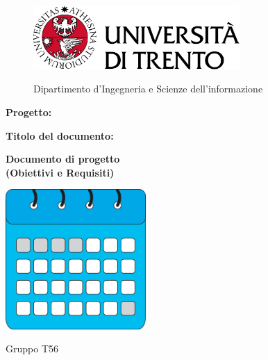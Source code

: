 \begin{titlepage}
    \begin{figure}[!htb]
        \includegraphics[width=0.7\textwidth]{img/logo_unitn.png}
        \endminipage
        \hfill
        \begin{flushright}
            \Large
            Dipartimento d'Ingegneria e Scienze dell'informazione
        \end{flushright}
        \endminipage
        \hfill
    \end{figure}

    \vspace{3cm}

    \large
    \textbf{Progetto:}
    \begin{center}
        \Huge
        \color{blue}
        \textbf{\nome}
    \end{center}

    \vspace{1cm}

    \textbf{Titolo del documento:}
    \begin{center}
        \huge
        \color{blue}
        \textbf{Documento di progetto}\\
        \textbf{(Obiettivi e Requisiti)}
    \end{center}

    \vspace{3cm}

    \begin{center}
        \includegraphics[width=0.4\textwidth]{img/logo.jpg}
    \end{center}
    \vspace{3cm}

    \begin{center}
        \large
        Gruppo T56
    \end{center}

\end{titlepage}